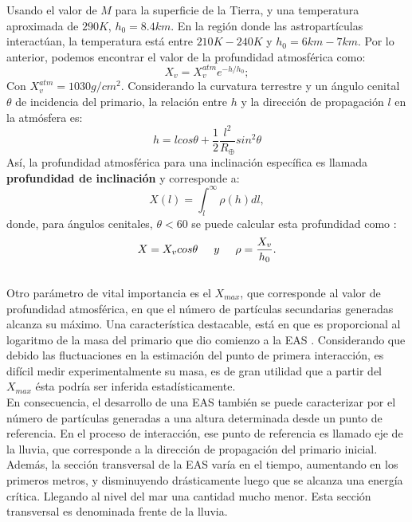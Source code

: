 Usando el valor de $M$ para la superficie de la Tierra, y una temperatura aproximada de $290 K$, $h_{0} = 8.4 km$. En la región donde las astropartículas interactúan, la temperatura está entre $210 K - 240 K$ y $h_{0} = 6 km - 7 km$.
Por lo anterior, podemos encontrar el valor de la profundidad atmosférica como:
\begin{equation}
    X_{v} = X_{v}^{atm} e^{-h/h_{0}};
    \label{eq:eq7}
\end{equation}
Con $X_{v}^{atm} = 1030 g/cm^{2}$.
Considerando la curvatura terrestre y un ángulo cenital $\theta$ de incidencia del primario, la relación entre $h$ y la dirección de propagación $l$ en la atmósfera es:
\begin{equation}
    h=lcos\theta + \frac{1}{2}\frac{l^2}{R_{\oplus}}sin^{2}\theta
    \label{eq:eq8}
\end{equation}{}
Así, la profundidad atmosférica para una inclinación específica es llamada \textbf{profundidad de inclinación} y corresponde a:
\begin{equation}
X(l) = \int_{l}^{\infty} \rho (h) dl,
\label{eq:eq9}
\end{equation}
donde, para ángulos cenitales, $\theta < 60 $ se puede calcular esta profundidad como \cite{mauro:oxigen}:
\begin{equation}
X = X_{v}cos\theta \hspace{0.5cm} y  \hspace{0.5cm} \rho = \frac{X_{v}}{h_{0}}.
\label{eq:eq10}
\end{equation}\\
Otro parámetro de vital importancia es el $X_{max}$, que corresponde al valor de profundidad atmosférica, en que el número de partículas secundarias generadas alcanza su máximo. Una característica destacable, está en que es proporcional al logaritmo de la masa del primario que dio comienzo a la EAS \cite{Xmax}. Considerando que debido las fluctuaciones en la estimación del punto de primera interacción, es difícil medir experimentalmente su masa, es de gran utilidad que a partir del $X_{max}$ ésta podría ser inferida estadísticamente\cite{Xmax}.\\

En consecuencia, el desarrollo de una EAS también se puede caracterizar por el número de partículas generadas a una altura determinada desde un punto de referencia. En el proceso de interacción, ese punto de referencia es llamado eje de la lluvia, que corresponde a la dirección de propagación del primario inicial. Además, la sección transversal de la EAS varía en el tiempo, aumentando en los primeros metros, y disminuyendo drásticamente luego que se alcanza una energía crítica. Llegando al nivel del mar una cantidad mucho menor. Esta sección transversal es denominada frente de la lluvia. \\

